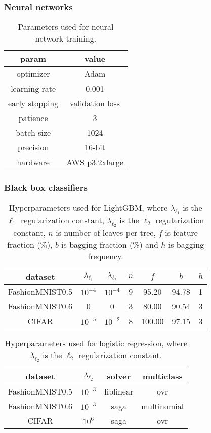 \documentclass{article} %
\begin{document}
\subsubsection{Neural networks}
\begin{table}\begin{tabular}{cc} param & value\\\hline
optimizer & Adam\\
learning rate & 0.001\\
early stopping & validation loss\\
patience & 3\\
batch size & 1024\\
precision & 16-bit\\
hardware & AWS p3.2xlarge
\end{tabular}\caption{Parameters used for neural network training. \label{tab:nn}}\end{table}

\subsubsection{Black box classifiers}
\begin{table}\begin{tabular}{ccccccc} dataset & $\lambda_{\ell_1}$ & $\lambda_{\ell_2}$ & $n$ & $f$ & $b$ & $h$\\\hline
FashionMNIST0.5 & $10^{-4}$ & $10^{-4}$ & 9 & 95.20 & 94.78 & 1\\
FashionMNIST0.6 & 0 & 0 & 3 & 80.00 & 90.54 & 3\\
CIFAR & $10^{-5}$ & $10^{-2}$ & 8 & 100.00 & 97.15 & 3
\end{tabular}\caption{
  Hyperparameters used for LightGBM, where $\lambda_{\ell_1}$ is the $\ell_1$ regularization constant, $\lambda_{\ell_2}$ is the $\ell_2$ regularization constant, $n$ is number of leaves per tree, $f$ is feature fraction (\%), $b$ is bagging fraction (\%) and $h$ is bagging frequency.
  \label{tab:lgb}
}\end{table}

\begin{table}\begin{tabular}{cccc} dataset & $\lambda_{\ell_2}$ & solver & multiclass\\\hline
FashionMNIST0.5 & $10^{-3}$ & liblinear & ovr\\
FashionMNIST0.6 & $10^{-3}$ & saga & multinomial\\
CIFAR & $10^6$ & saga & ovr
\end{tabular}\caption{
  Hyperparameters used for logistic regression, where $\lambda_{\ell_2}$ is the $\ell_2$ regularization constant.
  \label{tab:lr}
}\end{table}
\end{document}
